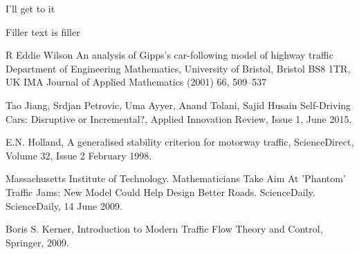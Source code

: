\begin{thebibliography}{9}

	I'll get to it

	Filler text is filler

    R Eddie Wilson
    An analysis of Gipps’s car-following model of highway traffic
    Department of Engineering Mathematics, University of Bristol, Bristol BS8 1TR, UK
    IMA Journal of Applied Mathematics (2001) 66, 509–537

	Tao Jiang, Srdjan Petrovic, Uma Ayyer, Anand Tolani, Sajid Husain
	Self-Driving Cars: Disruptive or Incremental?,
	Applied Innovation Review,
	Issue 1,
	June 2015.

	E.N. Holland,
	A generalised stability criterion for motorway traffic,
	ScienceDirect,
	Volume 32,
	Issue 2
	February 1998.

	Massachusetts Institute of Technology. 
	Mathematicians Take Aim At 'Phantom' Traffic Jams: New Model Could Help Design Better Roads.
	ScienceDaily. 
	ScienceDaily,
	14 June 2009.

	Boris S. Kerner,
	Introduction to Modern Traffic Flow Theory and Control,
	Springer,
	2009.

\end{thebibliography}
